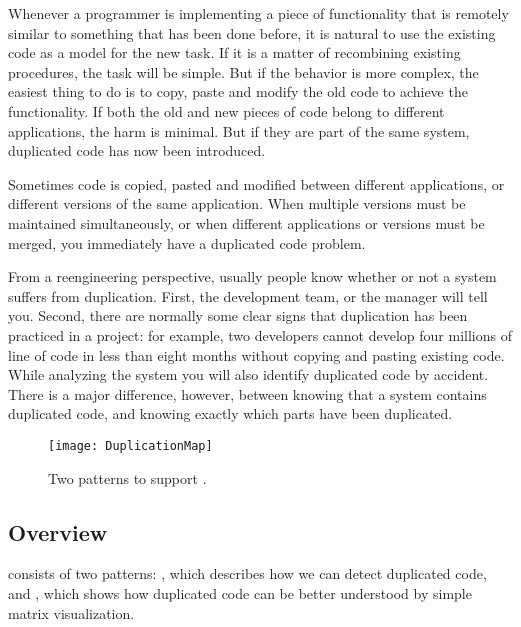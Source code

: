 \documentclass[a4paper,10pt,twoside]{book}
\begin{document}
\begin{bulletlist}
\item Whenever a programmer is implementing a piece of functionality that is remotely similar to something that has been done before, it is natural to use the existing code as a model for the new task. If it is a matter of recombining existing procedures, the task will be simple. But if the behavior is more complex, the easiest thing to do is to copy, paste and modify the old code to achieve the functionality. If both the old and new pieces of code belong to different applications, the harm is minimal. But if they are part of the same system, duplicated code has now been introduced.

\item Sometimes code is copied, pasted and modified between different applications, or different versions of the same application. When multiple versions must be maintained simultaneously, or when different applications or versions must be merged, you immediately have a duplicated code problem.
\end{bulletlist}

From a reengineering perspective, usually people know whether or not a system suffers from duplication. First, the development team, or the manager will tell you. Second, there are normally some clear signs that duplication has been practiced in a project: for example, two developers cannot develop four millions of line of code in less than eight months without copying and pasting existing code. While analyzing the system you will also identify duplicated code by accident. There is a major difference, however, between knowing that a system contains duplicated code, and knowing exactly which parts have been duplicated. 

\begin{figure}[h]
\begin{center}
\texttt{[image: DuplicationMap]}
\caption{Two patterns to support .}
\end{center}
\end{figure}

\subsection*{Overview}

 consists of two patterns: , which describes how we can detect duplicated code, and , which shows how duplicated code can be better understood by simple matrix visualization.
\end{document}

